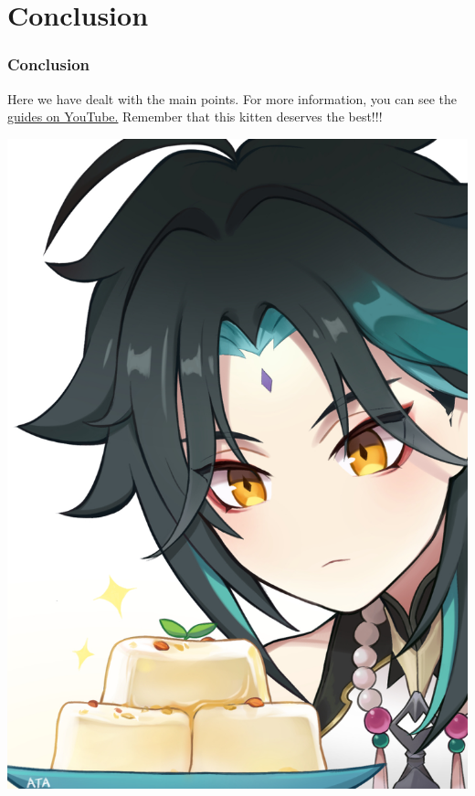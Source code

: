 \documentclass{beamer}
\begin{document}
\section{Conclusion}

\begin{frame}
\frametitle{Conclusion}

Here we have dealt with the main points. For more information, you can see the \href{https://www.youtube.com/watch?v=U_ow8r_vuzs}{guides on YouTube.} Remember that this kitten deserves the best!!! 

\begin{center}
     \includegraphics[width=0.3\linewidth]{xiao.png}
          \end{center}
\end{frame}



\end{document}
